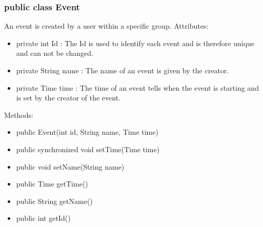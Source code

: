 	\subsubsection{public class Event}
	An event is created by a user within a specific group.
	\newline Attributes:
	\begin{itemize}
	\item private  int Id : The Id is used to identify each event and is therefore unique and can not be changed.
	\item private String name : The name of an event is given by the creator.
	\item private Time time : The time of an event tells when the event is starting and is set by the creator of the event.
	\end{itemize}
	Methods:
	\begin{itemize}
	\item public Event(int id, String name, Time time)
	\item public synchronized void setTime(Time time)
	\item public void setName(String name)
	\item public Time getTime()
	\item public String getName()
	\item public int getId()
	\end{itemize}

